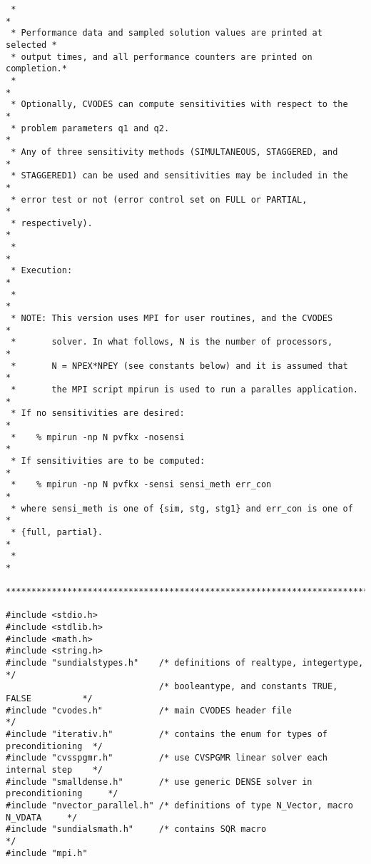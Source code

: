 \begin{verbatim}
 *                                                                      *
 * Performance data and sampled solution values are printed at selected *
 * output times, and all performance counters are printed on completion.*
 *                                                                      *
 * Optionally, CVODES can compute sensitivities with respect to the     *
 * problem parameters q1 and q2.                                        *
 * Any of three sensitivity methods (SIMULTANEOUS, STAGGERED, and       *
 * STAGGERED1) can be used and sensitivities may be included in the     *
 * error test or not (error control set on FULL or PARTIAL,             *
 * respectively).                                                       *
 *                                                                      *
 * Execution:                                                           *
 *                                                                      *
 * NOTE: This version uses MPI for user routines, and the CVODES        *
 *       solver. In what follows, N is the number of processors,        *
 *       N = NPEX*NPEY (see constants below) and it is assumed that     *
 *       the MPI script mpirun is used to run a paralles application.   *
 * If no sensitivities are desired:                                     *
 *    % mpirun -np N pvfkx -nosensi                                     *
 * If sensitivities are to be computed:                                 *
 *    % mpirun -np N pvfkx -sensi sensi_meth err_con                    *
 * where sensi_meth is one of {sim, stg, stg1} and err_con is one of    *
 * {full, partial}.                                                     *
 *                                                                      *
 ************************************************************************/

#include <stdio.h>
#include <stdlib.h>
#include <math.h>
#include <string.h>
#include "sundialstypes.h"    /* definitions of realtype, integertype,           */
                              /* booleantype, and constants TRUE, FALSE          */
#include "cvodes.h"           /* main CVODES header file                         */
#include "iterativ.h"         /* contains the enum for types of preconditioning  */
#include "cvsspgmr.h"         /* use CVSPGMR linear solver each internal step    */
#include "smalldense.h"       /* use generic DENSE solver in preconditioning     */
#include "nvector_parallel.h" /* definitions of type N_Vector, macro N_VDATA     */
#include "sundialsmath.h"     /* contains SQR macro                              */
#include "mpi.h"



\end{verbatim}
